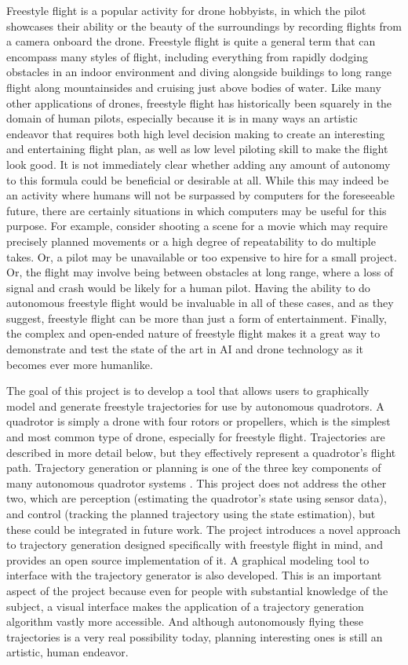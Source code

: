 \documentclass[pageno]{jpaper}
\begin{document}
Freestyle flight is a popular activity for drone hobbyists, in which the pilot showcases their ability or the beauty of the surroundings by recording flights from a camera onboard the drone. Freestyle flight is quite a general term that can encompass many styles of flight, including everything from rapidly dodging obstacles in an indoor environment and diving alongside buildings to long range flight along mountainsides and cruising just above bodies of water. Like many other applications of drones, freestyle flight has historically been squarely in the domain of human pilots, especially because it is in many ways an artistic endeavor that requires both high level decision making to create an interesting and entertaining flight plan, as well as low level piloting skill to make the flight look good. It is not immediately clear whether adding any amount of autonomy to this formula could be beneficial or desirable at all. While this may indeed be an activity where humans will not be surpassed by computers for the foreseeable future, there are certainly situations in which computers may be useful for this purpose. For example, consider shooting a scene for a movie which may require precisely planned movements or a high degree of repeatability to do multiple takes. Or, a pilot may be unavailable or too expensive to hire for a small project. Or, the flight may involve being between obstacles at long range, where a loss of signal and crash would be likely for a human pilot. Having the ability to do autonomous freestyle flight would be invaluable in all of these cases, and as they suggest, freestyle flight can be more than just a form of entertainment. Finally, the complex and open-ended nature of freestyle flight makes it a great way to demonstrate and test the state of the art in AI and drone technology as it becomes ever more humanlike.

The goal of this project is to develop a tool that allows users to graphically model and generate freestyle trajectories for use by autonomous quadrotors. A quadrotor is simply a drone with four rotors or propellers, which is the simplest and most common type of drone, especially for freestyle flight. Trajectories are described in more detail below, but they effectively represent a quadrotor's flight path. Trajectory generation or planning is one of the three key components of many autonomous quadrotor systems \cite{hanover}. This project does not address the other two, which are perception (estimating the quadrotor's state using sensor data), and control (tracking the planned trajectory using the state estimation), but these could be integrated in future work. The project introduces a novel approach to trajectory generation designed specifically with freestyle flight in mind, and provides an open source implementation of it. A graphical modeling tool to interface with the trajectory generator is also developed. This is an important aspect of the project because even for people with substantial knowledge of the subject, a visual interface makes the application of a trajectory generation algorithm vastly more accessible. And although autonomously flying these trajectories is a very real possibility today, planning interesting ones is still an artistic, human endeavor.
\end{document}
